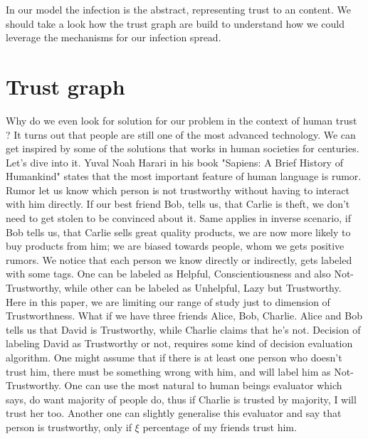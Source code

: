 \documentclass[nostrict]{szablonPG}
\begin{document}
In our model the infection is the abstract, representing trust to an content. We should take a look how the trust graph are build to understand how we could leverage the mechanisms for our infection spread.


\section{Trust graph}


Why do we even look for solution for our problem in the context of human trust ? It turns out that people are still one of the most advanced technology. We can get inspired by some of the solutions that works in human societies for centuries. Let's dive into it.
Yuval Noah Harari in his book "Sapiens: A Brief History of Humankind" \cite{harari2014sapiens} states that the most important feature of human language is rumor. Rumor let us know which person is not trustworthy without having to interact with him directly. If our best friend Bob, tells us, that Carlie is theft, we don't need to get stolen to be convinced about it. Same applies in inverse scenario, if Bob tells us, that Carlie sells great quality products, we are now more likely to buy products from him; we are biased towards people, whom we gets positive rumors. We notice that each person we know directly or indirectly, gets labeled with some tags. One can be labeled as Helpful, Conscientiousness and also Not-Trustworthy, while other can be labeled as Unhelpful, Lazy but Trustworthy. Here in this paper, we are limiting our range of study just to dimension of Trustworthness.
What if we have three friends Alice, Bob, Charlie. Alice and  Bob tells us that David is Trustworthy, while Charlie claims that he's not. Decision of labeling David as Trustworthy or not, requires some kind of decision evaluation algorithm.
One might assume that if there is at least one person who doesn't trust him, there must be something wrong with him, and will label him as Not-Trustworthy. One can use the most natural to human beings evaluator which says, do want majority of people do, thus if Charlie is trusted by majority, I will trust her too. Another one can slightly generalise this evaluator and say that person is trustworthy, only if $\xi$ percentage of my friends trust him. 
\end{document}
